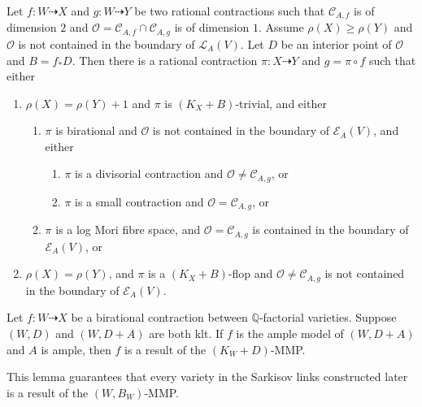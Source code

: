 \begin{lemma}\label{mapbetweenAM2}
  \cite[Lemma 3.5]{haconSarkisovProgram2012} Let $ f:W\dashrightarrow X $ and $ g:W\dashrightarrow  Y $ be two rational contractions such that $ \mathcal{C}_{A,f} $ is of dimension $ 2 $ and $ \mathcal{O}=\mathcal{C}_{A,f}\cap \mathcal{C}_{A,g} $ is of dimension $ 1 $. Assume $ \rho(X)\geqslant \rho(Y) $ and $ \mathcal{O} $ is not contained in the boundary of $ \mathcal{L}_{A}(V) $. Let $ D $ be an interior point of $ \mathcal{O} $ and $ B=f_*D $. Then there is a rational contraction $ \pi:X\dashrightarrow Y $ and $ g=\pi\circ f $ such that either
  \begin{enumerate}
    \item $ \rho(X)=\rho(Y)+1 $ and $ \pi  $ is $ (K_X+B) $-trivial, and either
          \begin{enumerate}
            \item $ \pi $ is birational and $ \mathcal{O} $ is not contained in the boundary of $ \mathcal{E}_A(V) $, and either
                  \begin{enumerate}
                    \item $ \pi $ is a divisorial contraction and $ \mathcal{O}\neq \mathcal{C}_{A,g} $, or
                    \item $ \pi $ is a small contraction and $ \mathcal{O}= \mathcal{C}_{A,g} $, or
                  \end{enumerate}
            \item $ \pi $ is a log Mori fibre space, and $ \mathcal{O}=\mathcal{C}_{A,g} $ is contained in the boundary of $ \mathcal{E}_{A}(V) $, or
          \end{enumerate}
    \item $ \rho(X)=\rho(Y) $, and $ \pi $ is  a $ (K_X+B) $-flop and $ \mathcal{O}\neq\mathcal{C}_{A,g} $ is not contained in the boundary of $ \mathcal{E}_A(V) $.
  \end{enumerate}
\end{lemma}

\begin{lemma}
  \cite[Lemma 3.6]{haconSarkisovProgram2012} Let $f:W\dashrightarrow X $ be a birational contraction between $\mathbb{Q}$-factorial varieties. Suppose $(W,D)$ and $(W,D+A)$ are both klt. If $f$ is the ample model of $(W,D+A)$ and $A$ is ample, then $f$ is a result of the  $(K_{W}+D)$-MMP.
\end{lemma}

This lemma guarantees that every variety in the Sarkisov links constructed later is a result of the $(W, B_{W})$-MMP.

